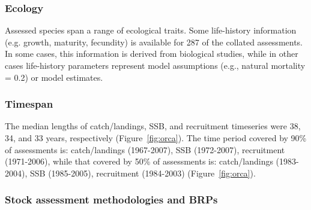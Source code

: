 \subsubsection*{Ecology}
Assessed species span a range of ecological traits. Some life-history
information (e.g. growth, maturity, fecundity) is available for
287 of the collated assessments. In some cases, this
information is derived from biological studies, while in other cases
life-history parameters represent model assumptions (e.g., natural
mortality = 0.2) or model estimates. 





\subsubsection*{Timespan }


The median lengths of catch/landings, SSB, and recruitment timeseries
were 38, 34, and 33
years, respectively (Figure~\ref{fig:orca}).  The time period covered by 90\% of assessments
is: catch/landings (1967-2007), SSB
(1972-2007), recruitment (1971-2006), while that
covered by 50\% of assessments is: catch/landings
(1983-2004), SSB (1985-2005), recruitment
(1984-2003) (Figure~\ref{fig:orca}).

\subsubsection*{Stock assessment methodologies and BRPs}

